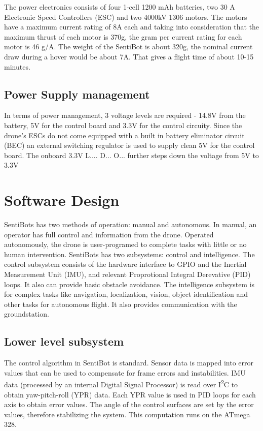 \documentclass[12pt]{article}
\begin{document}
The power electronics consists of four 1-cell 1200 mAh batteries, two 30 A Electronic Speed Controllers (ESC) and two 4000kV 1306 motors. The motors have a maximum current rating of 8A each and taking into consideration that the maximum thrust of each motor is 370g, the gram per current rating for each motor is 46 g/A. The weight of the SentiBot is about 320g, the nominal current draw during a hover would be about 7A. That gives a flight time of about 10-15 minutes. 

\subsection{Power Supply management}

In terms of power management, 3 voltage levels are required - 14.8V from the battery, 5V for the control board and 3.3V for the control circuity. Since the drone’s ESCs do not come equipped with a built in battery eliminator circuit (BEC) an external switching regulator is used to supply clean 5V for the control board. The onboard 3.3V L.... D... O... further steps down the voltage from 5V to 3.3V

\section{Software Design}

SentiBots has two methods of operation: manual and autonomous. In manual, an operator has full control and information from the drone. Operated autonomously, the drone is user-programed to complete tasks with little or no human intervention. SentiBots has two subsystems: control and intelligence. The control subsystem consists of the hardware interface to GPIO and the Inertial Measurement Unit (IMU), and relevant Proprotional Integral Derevative (PID) loops. It also can provide basic obstacle avoidance. The intelligence subsystem is for complex tasks like navigation, localization, vision, object identification and other tasks for autonomous flight. It also provides communication with the groundstation.

\subsection{Lower level subsystem}

The control algorithm in SentiBot is standard. Sensor data is mapped into error values that can be used to compensate for frame errors and instabilities. IMU data (processed by an internal Digital Signal Processor) is read over I\textsuperscript{2}C to obtain yaw-pitch-roll (YPR) data. Each YPR value is used in PID loops for each axis to obtain error values. The angle of the control surfaces are set by the error values, therefore stabilizing the system. This computation runs on the ATmega 328.
\end{document}
